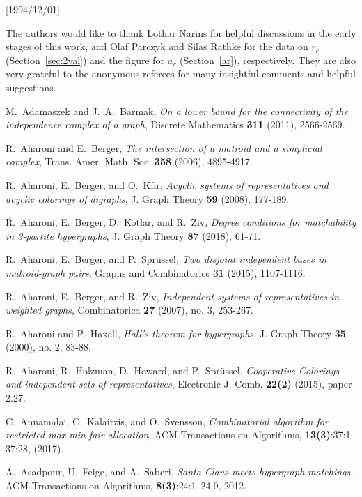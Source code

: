 \NeedsTeXFormat{LaTeX2e}[1994/12/01]\documentclass[letterpaper, 11pt]{article}
\theoremstyle{definition}
\theoremstyle{remark}
\numberwithin{equation}{section}
\begin{document}
\medskip
{} The authors would like to thank Lothar
Narins for helpful discussions in the early stages of this work, and Olaf Parczyk and Silas Rathke 
for the data on $r_c$  (Section~\ref{sec:2val}) and the figure for $a_r$ (Section~\ref{ar}), respectively.
They are also very grateful to the anonymous referees for many insightful comments and helpful suggestions. 


\begin{thebibliography}{10}

M.~Adamaszek and J.~A.~Barmak, \emph{On a lower bound for the connectivity of the independence complex of a graph}, Discrete Mathematics \textbf{311} (2011), 2566-2569.

R.~Aharoni and E.~Berger, \emph{The intersection of a matroid and a
  simplicial complex}, Trans. Amer. Math. Soc. \textbf{358} (2006),
4895-4917.

R.~Aharoni, E.~Berger, and O.~Kfir, \emph{Acyclic systems of
  representatives and acyclic colorings of digraphs}, J. Graph Theory
\textbf{59} (2008), 177-189.  

R.~Aharoni, E.~Berger, D.~Kotlar, and R.~Ziv, \emph{Degree conditions for
matchability in 3-partite hypergraphs}, J. Graph Theory
\textbf{87} (2018), 61-71. 

R.~Aharoni, E.~Berger, and P.~Spr\"ussel, \emph{Two disjoint
  independent bases in matroid-graph pairs}, Graphs and Combinatorics \textbf{31} (2015), 1107-1116. 

R.~Aharoni, E.~Berger, and R.~Ziv, \emph{Independent systems of representatives in weighted graphs}, Combinatorica \textbf{27} (2007), no. 3, 253-267.

R.~Aharoni and P.~Haxell, \emph{Hall's theorem for hypergraphs}, J. Graph Theory \textbf{35} (2000), no. 2, 83-88.

R.~Aharoni, R.~Holzman, D.~Howard, and P.~Spr\"ussel,
\emph{Cooperative Colorings and independent sets of representatives},
Electronic J. Comb. \textbf{22(2)} (2015), paper 2.27. 

C.~Annamalai, C.~Kalaitzis, and O.~Svensson,  \emph{Combinatorial algorithm for restricted max-min
fair allocation}, ACM Transactions on Algorithms, \textbf{13(3)}:37:1–37:28, (2017).

A.~Asadpour, U.~Feige, and A.~Saberi. \emph{Santa Claus meets hypergraph
  matchings}, ACM 
Transactions on Algorithms, \textbf{8(3)}:24:1–24:9, 2012.


\end{thebibliography}
\end{document}

